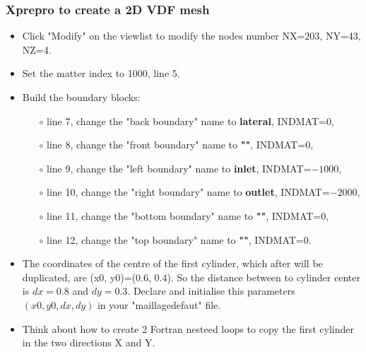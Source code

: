 \documentclass[10pt]{beamer}
\begin{document}
\begin{frame}
\frametitle{Xprepro to create a 2D VDF mesh}
\begin{block}{}

\begin{itemize}
\item Click "Modify" on the viewlist to modify the nodes number NX=203, NY=43, NZ=4.
\item Set the matter index to 1000, line 5.
\item Build the boundary blocks:
    \begin{itemize}
    \item [$\circ$] line 7, change the "back boundary" name to \textbf{lateral}, INDMAT=$0$,
    \item [$\circ$] line 8, change the "front boundary" name to \textbf{""}, INDMAT=$0$,
    \item [$\circ$] line 9, change the "left boundary" name to \textbf{inlet}, INDMAT=$-1000$,
    \item [$\circ$] line 10, change the "right boundary" name to \textbf{outlet}, INDMAT=$-2000$,
    \item [$\circ$] line 11, change the "bottom boundary" name to \textbf{""}, INDMAT=$0$,
    \item [$\circ$] line 12, change the "top boundary" name to \textbf{""}, INDMAT=$0$.
    \end{itemize}

\item The coordinates of the centre of the first cylinder, which after will be duplicated, are (x0, y0)=(0.6, 0.4). So the distance between to cylinder center is $dx=0.8$ and $dy=0.3$. Declare and initialise this parameters $(x0, y0, dx, dy)$ in your "maillagedefaut" file.

\item Think about how to create 2 Fortran nesteed loops to copy the first cylinder in the two directions X and Y.
\end{itemize}

\end{block}
\end{frame}
\end{document}
